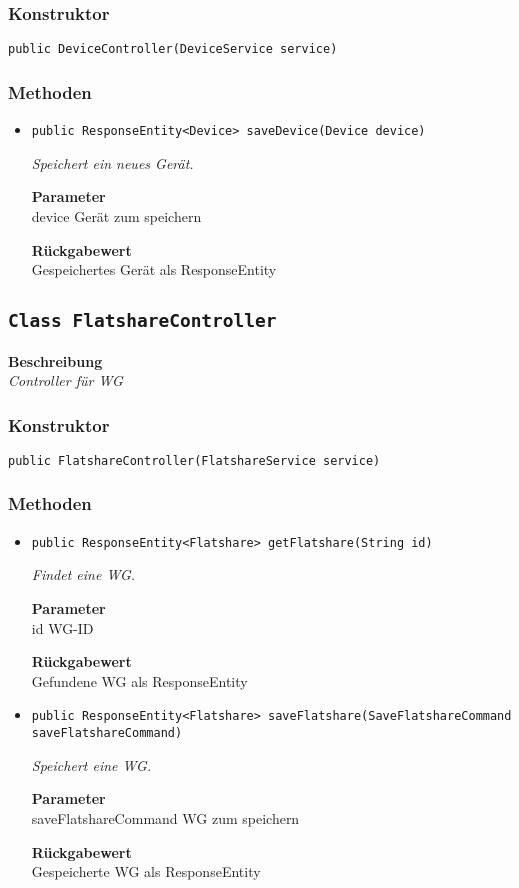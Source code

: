     \subsubsection{Konstruktor}
    \texttt{public DeviceController(DeviceService service)}
    \subsubsection{Methoden}
    \begin{itemize}
    	\item{\texttt{public ResponseEntity<Device> saveDevice(Device device)}}
    	
    	\textit{Speichert ein neues Gerät.}
    	
    	\textbf{Parameter} \\
    	device Gerät zum speichern
    	
    	\textbf{Rückgabewert} \\
    	Gespeichertes Gerät als ResponseEntity
    \end{itemize}
    \subsection{\texttt{Class FlatshareController}}
    \textbf{Beschreibung} \\
    \textit{Controller für WG}
    \subsubsection{Konstruktor}
    \texttt{public FlatshareController(FlatshareService service)}
    \subsubsection{Methoden}
    \begin{itemize}
    	\item{\texttt{public ResponseEntity<Flatshare> getFlatshare(String id)}}
    	
    	\textit{Findet eine WG.}
    	
    	\textbf{Parameter} \\
    	id WG-ID
    	
    	\textbf{Rückgabewert} \\
    	Gefundene WG als ResponseEntity        \item{\texttt{public ResponseEntity<Flatshare> saveFlatshare(SaveFlatshareCommand saveFlatshareCommand)}}
    	
    	\textit{Speichert eine WG.}
    	
    	\textbf{Parameter} \\
    	saveFlatshareCommand WG zum speichern
    	
    	\textbf{Rückgabewert} \\
    	Gespeicherte WG als ResponseEntity
    \end{itemize}
